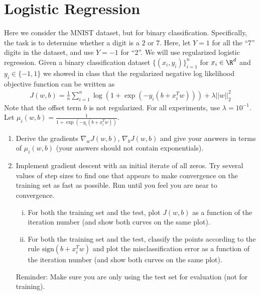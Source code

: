 \documentclass{article}
\begin{document}
\section*{Logistic Regression}
\begin{aprob}
    Here we consider the MNIST dataset, but for binary classification. Specifically, the task is to determine whether a digit is a $2$ or $7$.
    Here, let $Y=1$ for all the ``7'' digits in the dataset, and use $Y=-1$ for ``2''.
    We will use regularized logistic regression. 
    Given a binary classification dataset $\{(x_i,y_i)\}_{i=1}^n$ for $x_i \in \R^d$ and $y_i \in \{-1,1\}$ we showed in class that the regularized negative log likelihood objective function can be written as
    \begin{align*}
    J(w,b) = \frac{1}{n} \sum_{i=1}^n \log( 1 + \exp(-y_i (b + x_i^T w))) + \lambda ||w||_2^2
    \end{align*} 
    Note that the offset term $b$ is not regularized. 
    For all experiments, use $\lambda = 10^{-1}$. 
    Let $\mu_i(w,b) = \frac{1}{1+ \exp(-y_i (b + x_i^T w))}$. 
    \begin{enumerate}
        \item {} Derive the gradients $\nabla_w J(w,b)$, $\nabla_{b} J(w,b)$ and give your answers in terms of $\mu_i(w,b)$ (your answers should not contain exponentials).
        \item {} Implement gradient descent with an initial iterate of all zeros. Try several values of step sizes to find one that appears to make convergence on the training set as fast as possible. Run until you feel you are near to convergence.
        \begin{enumerate}[(i)]
            \item For both the training set and the test, plot $J(w,b)$ as a function of the iteration number (and show both curves on the same plot).  
            \item For both the training set and the test, classify the points according to the rule $\text{sign}(b + x_i^T w)$ and plot the misclassification error as a function of the iteration number (and show both curves on the same plot). 
        \end{enumerate}
          
        Reminder: Make sure you are only using the test set for evaluation (not for training).
          

\end{enumerate}
\end{aprob}
\end{document}

